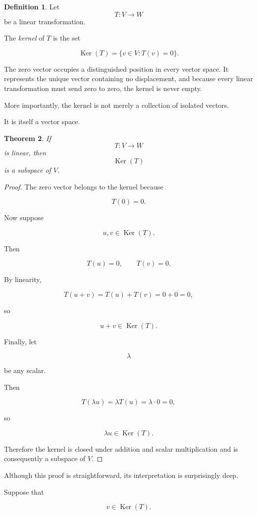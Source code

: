 \documentclass[11pt]{book}
\numberwithin{equation}{chapter}
\theoremstyle{definition}
\newtheorem{definition}{Definition}[chapter]
\theoremstyle{plain}
\newtheorem{theorem}[definition]{Theorem}
\theoremstyle{remark}
\DeclareMathOperator{\Ker}{Ker}
\begin{document}
\begin{definition}
Let
\[
T:V\rightarrow W
\]
be a linear transformation.

The \emph{kernel} of \(T\) is the set

\[
\Ker(T)
=
\{v\in V:T(v)=0\}.
\]
\end{definition}

The zero vector occupies a distinguished position in every vector space. It represents the unique vector containing no displacement, and because every linear transformation must send zero to zero, the kernel is never empty.

More importantly, the kernel is not merely a collection of isolated vectors.

It is itself a vector space.

\begin{theorem}
If
\[
T:V\rightarrow W
\]
is linear, then
\[
\Ker(T)
\]
is a subspace of \(V\).
\end{theorem}

\begin{proof}

The zero vector belongs to the kernel because

\[
T(0)=0.
\]

Now suppose

\[
u,v\in\Ker(T).
\]

Then

\[
T(u)=0,
\qquad
T(v)=0.
\]

By linearity,

\[
T(u+v)
=
T(u)+T(v)
=
0+0
=
0,
\]

so

\[
u+v\in\Ker(T).
\]

Finally, let

\[
\lambda
\]

be any scalar.

Then

\[
T(\lambda u)
=
\lambda T(u)
=
\lambda\cdot0
=
0,
\]

so

\[
\lambda u\in\Ker(T).
\]

Therefore the kernel is closed under addition and scalar multiplication and is consequently a subspace of \(V\).

\end{proof}

Although this proof is straightforward, its interpretation is surprisingly deep.

Suppose that

\[
v\in\Ker(T).
\]
\end{document}
